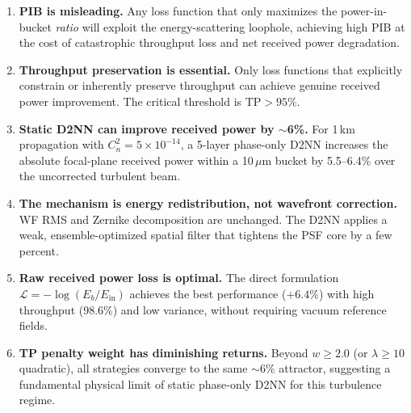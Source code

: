 \documentclass[11pt,a4paper]{article}
\begin{document}
\begin{enumerate}
\item \textbf{PIB is misleading.} Any loss function that only maximizes the power-in-bucket \textit{ratio} will exploit the energy-scattering loophole, achieving high PIB at the cost of catastrophic throughput loss and net received power degradation.

\item \textbf{Throughput preservation is essential.} Only loss functions that explicitly constrain or inherently preserve throughput can achieve genuine received power improvement. The critical threshold is $\mathrm{TP} > 95\%$.

\item \textbf{Static D2NN can improve received power by $\sim$6\%.} For 1\,km propagation with $C_n^2 = 5 \times 10^{-14}$, a 5-layer phase-only D2NN increases the absolute focal-plane received power within a 10\,$\mu$m bucket by 5.5--6.4\% over the uncorrected turbulent beam.

\item \textbf{The mechanism is energy redistribution, not wavefront correction.} WF RMS and Zernike decomposition are unchanged. The D2NN applies a weak, ensemble-optimized spatial filter that tightens the PSF core by a few percent.

\item \textbf{Raw received power loss is optimal.} The direct formulation $\mathcal{L} = -\log(E_b / E_{\mathrm{in}})$ achieves the best performance ($+6.4\%$) with high throughput (98.6\%) and low variance, without requiring vacuum reference fields.

\item \textbf{TP penalty weight has diminishing returns.} Beyond $w \geq 2.0$ (or $\lambda \geq 10$ quadratic), all strategies converge to the same $\sim$6\% attractor, suggesting a fundamental physical limit of static phase-only D2NN for this turbulence regime.
\end{enumerate}
\end{document}
